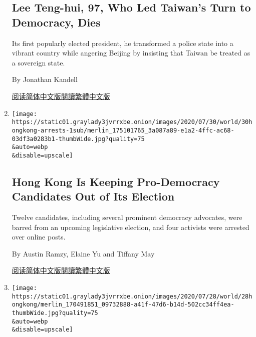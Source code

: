 \begin{enumerate}
{  \subsection{Lee Teng-hui, 97, Who Led Taiwan's Turn to Democracy,
  Dies}\label{lee-teng-hui-97-who-led-taiwans-turn-to-democracy-dies}}

  Its first popularly elected president, he transformed a police state
  into a vibrant country while angering Beijing by insisting that Taiwan
  be treated as a sovereign state.

  By Jonathan Kandell

  \href{https://cn.nytimes3xbfgragh.onion/asia-pacific/20200730/lee-teng-hui-dead/}{阅读简体中文版}\href{https://cn.nytimes3xbfgragh.onion/asia-pacific/20200730/lee-teng-hui-dead/zh-hant/}{閱讀繁體中文版}
\item
  \href{/2020/07/29/world/asia/hong-kong-arrests-security-law.html}{}

  \texttt{[image: https://static01.graylady3jvrrxbe.onion/images/2020/07/30/world/30hongkong-arrests-1sub/merlin\_175101765\_3a087a89-e1a2-4ffc-ac68-03df3a0283b1-thumbWide.jpg?quality=75\\\&auto=webp\\\&disable=upscale]}

  \hypertarget{hong-kong-is-keeping-pro-democracy-candidates-out-of-its-election}{%
  \subsection{Hong Kong Is Keeping Pro-Democracy Candidates Out of Its
  Election}\label{hong-kong-is-keeping-pro-democracy-candidates-out-of-its-election}}

  Twelve candidates, including several prominent democracy advocates,
  were barred from an upcoming legislative election, and four activists
  were arrested over online posts.

  By Austin Ramzy, Elaine Yu and Tiffany May

  \href{https://cn.nytimes3xbfgragh.onion/china/20200730/hong-kong-arrests-security-law/}{阅读简体中文版}\href{https://cn.nytimes3xbfgragh.onion/china/20200730/hong-kong-arrests-security-law/zh-hant/}{閱讀繁體中文版}
\item
  \href{/2020/07/28/world/asia/benny-tai-hong-kong-university.html}{}

  \texttt{[image: https://static01.graylady3jvrrxbe.onion/images/2020/07/28/world/28hongkong/merlin\_170491851\_09732888-a41f-47d6-b14d-502cc34ff4ea-thumbWide.jpg?quality=75\\\&auto=webp\\\&disable=upscale]}


\end{enumerate}
